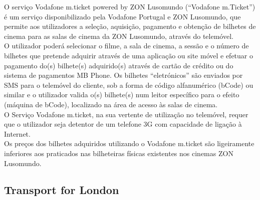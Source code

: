 O serviço Vodafone m.ticket powered by ZON Lusomundo (“Vodafone m.Ticket”) é um serviço disponibilizado pela Vodafone Portugal e ZON Lusomundo, que permite aos utilizadores a seleção, aquisição, pagamento e obtenção de bilhetes de cinema para as salas de cinema da ZON Lusomundo, através do telemóvel.
\\O utilizador poderá selecionar o filme, a sala de cinema, a sessão e o número de bilhetes que pretende adquirir através de uma aplicação ou site móvel e efetuar o pagamento do(s) bilhete(s) adquirido(s) através de cartão de crédito ou do sistema de pagamentos MB Phone. Os bilhetes “eletrónicos” são enviados por SMS para o telemóvel do cliente, sob a forma de código alfanumérico (bCode) ou similar e o utilizador valida o(s) bilhete(s) num leitor específico para o efeito (máquina de bCode), localizado na área de acesso às salas de cinema.
\\O Serviço Vodafone m.ticket, na sua vertente de utilização no telemóvel, requer que o utilizador seja detentor de um telefone 3G com capacidade de ligação à Internet.
\\Os preços dos bilhetes adquiridos utilizando o Vodafone m.ticket são ligeiramente inferiores aos praticados nas bilheteiras físicas existentes nos cinemas ZON Lusomundo.\cite{mticket}

\subsection{Transport for London}

